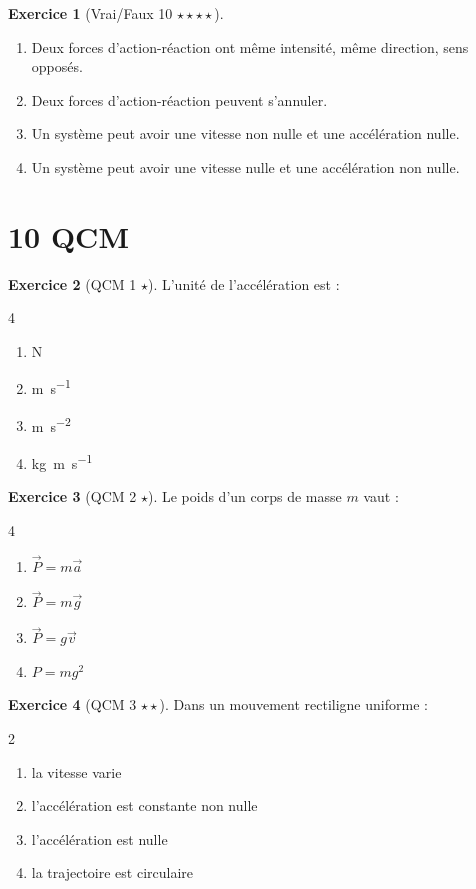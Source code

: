 \documentclass[11pt,a4paper]{article}
\theoremstyle{definition}
\newtheorem{exercice}{Exercice}[section]
\newcommand{\etoiles}[1]{\hfill{\small\textbf{#1}}}
\begin{document}
\begin{exercice}[Vrai/Faux 10 \etoiles{$\star\star\star\star$}]
\begin{enumerate}[label=\alph*)]
    \item Deux forces d’action-réaction ont même intensité, même direction, sens opposés.
    \item Deux forces d’action-réaction peuvent s’annuler.
    \item Un système peut avoir une vitesse non nulle et une accélération nulle.
    \item Un système peut avoir une vitesse nulle et une accélération non nulle.
\end{enumerate}
\end{exercice}

\section{10 QCM}

\begin{exercice}[QCM 1 \etoiles{$\star$}]
L’unité de l’accélération est :
\begin{multicols}{4}
\begin{enumerate}[label=\Alph*.]
    \item \si{N}
    \item \si{m.s^{-1}}
    \item \si{m.s^{-2}}
    \item \si{kg.m.s^{-1}}
\end{enumerate}
\end{multicols}
\end{exercice}

\begin{exercice}[QCM 2 \etoiles{$\star$}]
Le poids d’un corps de masse $m$ vaut :
\begin{multicols}{4}
\begin{enumerate}[label=\Alph*.]
    \item $\vec{P}=m\vec{a}$
    \item $\vec{P}=m\vec{g}$
    \item $\vec{P}=g\vec{v}$
    \item $P=mg^2$
\end{enumerate}
\end{multicols}
\end{exercice}

\begin{exercice}[QCM 3 \etoiles{$\star\star$}]
Dans un mouvement rectiligne uniforme :
\begin{multicols}{2}
\begin{enumerate}[label=\Alph*.]
    \item la vitesse varie
    \item l’accélération est constante non nulle
    \item l’accélération est nulle
    \item la trajectoire est circulaire
\end{enumerate}
\end{multicols}
\end{exercice}
\end{document}
